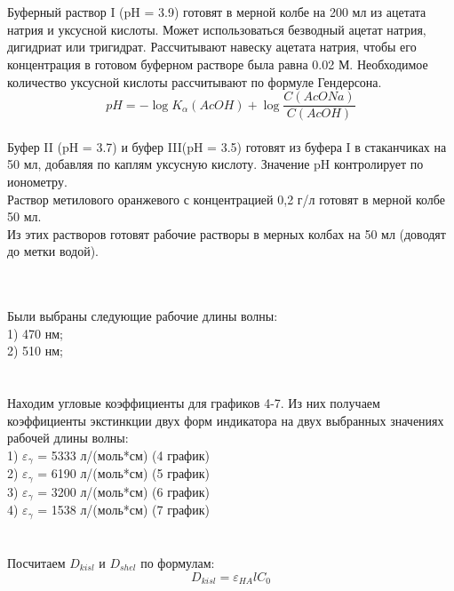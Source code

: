 \documentclass[a4paper,12pt]{article} %
\begin{document}
\quad
\\
\\Буферный раствор I (pH = 3.9) готовят в мерной колбе на 200 мл из ацетата натрия и уксусной кислоты. Может использоваться безводный ацетат натрия, дигидриат или тригидрат. Рассчитывают навеску ацетата натрия, чтобы его концентрация в готовом буферном растворе была равна 0.02 М. Необходимое количество уксусной кислоты рассчитывают по формуле Гендерсона.
\begin{equation}
    pH = - \log{K_{\alpha}(AcOH)} + \log{\frac{C(AcONa)}{C(AcOH)}}
\end{equation}
\\Буфер II (pH = 3.7) и буфер III(pH = 3.5) готовят из буфера I в стаканчиках на 50 мл, добавляя по каплям уксусную кислоту. Значение pH контролирует по ионометру.
\\Раствор метилового оранжевого с концентрацией 0,2 г/л готовят в мерной колбе 50 мл.
\\Из этих растворов готовят рабочие растворы в мерных колбах на 50 мл (доводят до метки водой).

\quad
\\
\\Были выбраны следующие рабочие длины волны:
\\1) 470 нм;
\\2) 510 нм;
\paragraph{}
\\
Находим угловые коэффициенты для графиков 4-7. Из них получаем коэффициенты экстинкции двух форм индикатора на двух выбранных значениях рабочей длины волны:
\\1) $\varepsilon_{\gamma}$ = 5333 л/(моль*см) (4 график)
\\2) $\varepsilon_{\gamma}$ = 6190 л/(моль*см) (5 график)
\\3) $\varepsilon_{\gamma}$ = 3200 л/(моль*см) (6 график)
\\4) $\varepsilon_{\gamma}$ = 1538 л/(моль*см) (7 график)

\paragraph{}
\\
Посчитаем $D_{kisl}$ и $D_{shel}$ по формулам:
\begin{equation}
    D_{kisl} = \varepsilon_{HA}l C_0
\end{equation}
\end{document}

